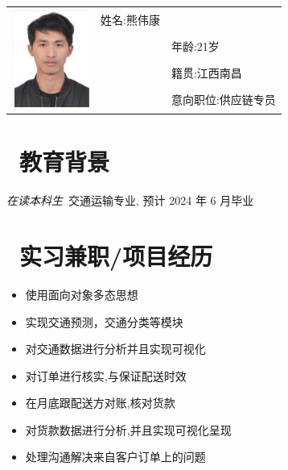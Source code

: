 \documentclass{resume}
\begin{document}

\Large{
  \begin{tabu}{c  l  l}
    & \scshape{姓名:熊伟康} \\
    & &年龄:21岁\\
    & &籍贯:江西南昌\\
    & & 意向职位:供应链专员\\
  \end{tabu}
}


\section{\faGraduationCap\  教育背景}
\textit{在读本科生}\ 交通运输专业, 预计 2024 年 6 月毕业

\section{\faUsers\ 实习兼职/项目经历}

\begin{itemize}
  \item 使用面向对象多态思想
  \item 实现交通预测，交通分类等模块
  \item 对交通数据进行分析并且实现可视化
\end{itemize}

\begin{itemize}
  \item 对订单进行核实,与保证配送时效
  \item 在月底跟配送方对账,核对货款
  \item 对货款数据进行分析,并且实现可视化呈现
  \item 处理沟通解决来自客户订单上的问题
\end{itemize}
\end{document}
